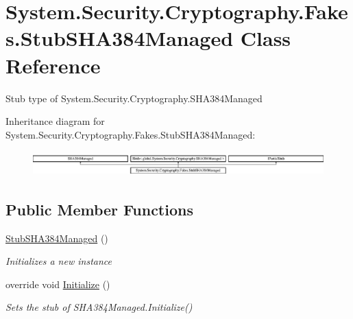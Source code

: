 \hypertarget{class_system_1_1_security_1_1_cryptography_1_1_fakes_1_1_stub_s_h_a384_managed}{\section{System.\-Security.\-Cryptography.\-Fakes.\-Stub\-S\-H\-A384\-Managed Class Reference}
\label{class_system_1_1_security_1_1_cryptography_1_1_fakes_1_1_stub_s_h_a384_managed}
}


Stub type of System.\-Security.\-Cryptography.\-S\-H\-A384\-Managed 


Inheritance diagram for System.\-Security.\-Cryptography.\-Fakes.\-Stub\-S\-H\-A384\-Managed\-:\begin{figure}[H]
\begin{center}
\leavevmode
\includegraphics[height=0.964686cm]{class_system_1_1_security_1_1_cryptography_1_1_fakes_1_1_stub_s_h_a384_managed}
\end{center}
\end{figure}
\subsection*{Public Member Functions}
\begin{DoxyCompactItemize}
\item 
\hyperlink{class_system_1_1_security_1_1_cryptography_1_1_fakes_1_1_stub_s_h_a384_managed_a12e3ac5857528fc4f947912f28be0300}{Stub\-S\-H\-A384\-Managed} ()
\begin{DoxyCompactList}\small\item\em Initializes a new instance\end{DoxyCompactList}\item 
override void \hyperlink{class_system_1_1_security_1_1_cryptography_1_1_fakes_1_1_stub_s_h_a384_managed_aae7270fd0b1cde41a2aaea89e6fa49f7}{Initialize} ()
\begin{DoxyCompactList}\small\item\em Sets the stub of S\-H\-A384\-Managed.\-Initialize()\end{DoxyCompactList}\end{DoxyCompactItemize}
